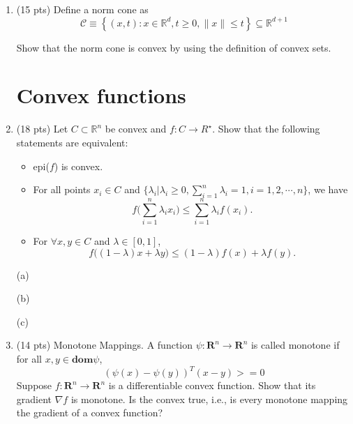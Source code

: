 \documentclass[10pt]{article}
\renewcommand{\mathbf}{\boldsymbol}
\begin{document}
\begin{enumerate}
\newpage

\item {\color{red} (15 pts)} Define a norm cone as
$$
\mathcal{C} \equiv \left\{(x, t): x \in \mathbb{R}^d, t \geq 0,\|x\| \leq t\right\} \subseteq \mathbb{R}^{d+1}
$$

Show that the norm cone is convex by using the definition of convex sets.\\








\newpage

\section{Convex functions}
\item {\color{red} (18 pts)} Let $C\subset \mathbb{R}^n$ be convex and $f:C\rightarrow R^\star$. Show that the following statements are equivalent:
\begin{itemize}
    \item[(a)] epi($f$) is convex.
    \item[(b)] For all points $x_i\in C$ and $\{\lambda_i|\lambda_i\geq0, \sum_{i=1}^n \lambda_i=1, i=1,2,\cdots,n\}$, we have
    \begin{equation*}
        f\Big(\sum\limits_{i=1}^n \lambda_ix_i\Big)\leq \sum\limits_{i=1}^n \lambda_if(x_i).
    \end{equation*}
    \item[(c)] For $\forall x,y\in C$ and $\lambda\in[0,1]$,
    \begin{equation*}
        f\Big((1-\lambda)x+\lambda y\Big)\leq(1-\lambda)f(x)+\lambda f(y).
    \end{equation*}
\end{itemize}

(a)





(b)





(c)







\newpage

\item {\color{red} (14 pts)} {Monotone Mappings. A function $\psi:\mathbf{R}^n \to \mathbf{R}^n$ is called monotone if for all $x,y \in \mathbf{dom} \psi$,
    $$(\psi(x) - \psi (y))^T (x-y) >= 0$$
Suppose $f : \mathbf{R}^n \to \mathbf{R}^n$ is a differentiable convex function. Show that its gradient $\nabla f$ is monotone. Is the convex true, i.e., is every monotone mapping the gradient of a convex function?}\\








\end{enumerate}
\end{document}
